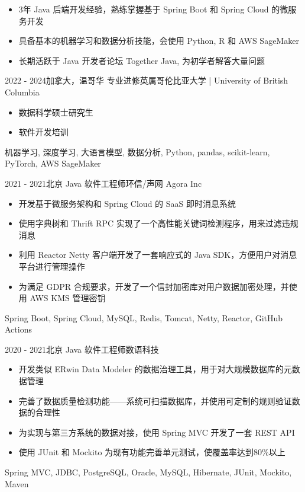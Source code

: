 \documentclass[alternative]{resume_template}
\begin{document}
	\makecvheader

    \begin{itemize}
        \item 3年 Java 后端开发经验，熟练掌握基于 Spring Boot 和 Spring Cloud 的微服务开发 
        \item 具备基本的机器学习和数据分析技能，会使用 Python, R 和 AWS SageMaker 
        \item 长期活跃于 Java 开发者论坛 Together Java, 为初学者解答大量问题
    \end{itemize}

    \begin{experiences}
    
    \experience
    {2022 - 2024}{加拿大，温哥华}
    {专业进修}{英属哥伦比亚大学 | University of British Columbia}
    {
        \begin{itemize}
        \item 数据科学硕士研究生
        \item 软件开发培训
        \end{itemize}
    }
    {机器学习, 深度学习, 大语言模型, 数据分析, Python, pandas, scikit-learn, PyTorch, AWS SageMaker}
    
    \experience
    {2021 - 2021}{北京}
    {Java 软件工程师}{环信/声网 Agora Inc}
    {
        \begin{itemize}
        \item 开发基于微服务架构和 Spring Cloud 的 SaaS 即时消息系统
        \item 使用字典树和 Thrift RPC 实现了一个高性能关键词检测程序，用来过滤违规消息
        \item 利用 Reactor Netty 客户端开发了一套响应式的 Java SDK，方便用户对消息平台进行管理操作
        \item 为满足 GDPR 合规要求，开发了一个信封加密库对用户数据加密处理，并使用 AWS KMS 管理密钥
        \end{itemize}
    }
    {Spring Boot, Spring Cloud, MySQL, Redis, Tomcat, Netty, Reactor, GitHub Actions}
    
    \experience
    {2020 - 2021}{北京}
    {Java 软件工程师}{数语科技}
    {
        \begin{itemize}
        \item 开发类似 ERwin Data Modeler 的数据治理工具，用于对大规模数据库的元数据管理
        \item 完善了数据质量检测功能——系统可扫描数据库，并使用可定制的规则验证数据的合理性
        \item 为实现与第三方系统的数据对接，使用 Spring MVC 开发了一套 REST API
        \item 使用 JUnit 和 Mockito 为现有功能完善单元测试，使覆盖率达到80\%以上
        \end{itemize}
    }
    {Spring MVC, JDBC, PostgreSQL, Oracle, MySQL, Hibernate, JUnit, Mockito, Maven}
    

\end{experiences}
\end{document}
